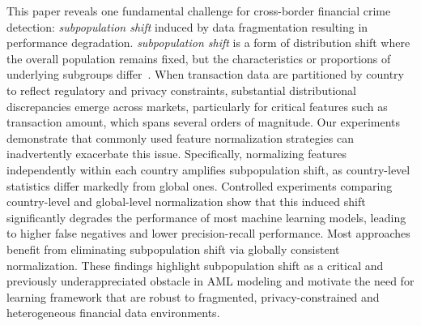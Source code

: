 \documentclass[11pt,english]{article}
\begin{document}
This paper reveals one fundamental challenge for cross-border financial crime detection: \textit{subpopulation shift} induced by data fragmentation resulting in performance degradation. \textit{subpopulation shift} is a form of distribution shift where the overall population remains fixed, but the characteristics or proportions of underlying subgroups differ~\parencite{koh2021wilds}. When transaction data are partitioned by country to reflect regulatory and privacy constraints, substantial distributional discrepancies emerge across markets, particularly for critical features such as transaction amount, which spans several orders of magnitude. Our experiments demonstrate that commonly used feature normalization strategies can inadvertently exacerbate this issue. Specifically, normalizing features independently within each country amplifies subpopulation shift, as country-level statistics differ markedly from global ones. Controlled experiments comparing country-level and global-level normalization show that this induced shift significantly degrades the performance of most machine learning models, leading to higher false negatives and lower precision-recall performance. Most approaches benefit from eliminating subpopulation shift via globally consistent normalization. These findings highlight subpopulation shift as a critical and previously underappreciated obstacle in AML modeling and motivate the need for learning framework that are robust to fragmented, privacy-constrained and heterogeneous financial data environments.
\end{document}
